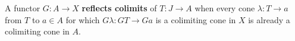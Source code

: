 A functor $G: A \to X$ \textbf{reflects colimits} of $T: J \to A$ when every cone $\lambda: T \to a$ from $T$ to $a \in A$ for which $G\lambda: GT \to Ga$ is a colimiting cone in $X$ is already a colimiting cone in $A$.
